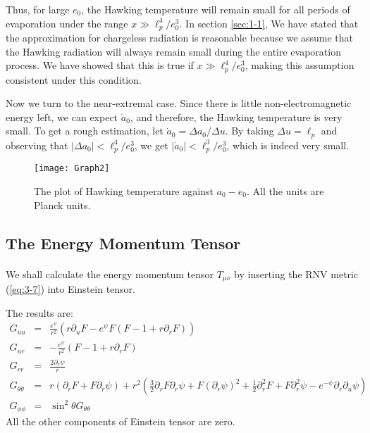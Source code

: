 \documentclass[letterpaper,12pt]{article}
\begin{document}
Thus, for large $e_{0}$, the Hawking temperature will remain small for all periods of evaporation under the range $x \gg \ell_{p}^{4}/e_{0}^{3}$. In section \ref{sec:1-1}, We have stated that the approximation for chargeless radiation is reasonable because we assume that the Hawking radiation will always remain small during the entire evaporation process. We have showed that this is true if $x \gg \ell_{p}^{4}/e_{0}^{3}$, making this assumption consistent under this condition. 

Now we turn to the near-extremal case. Since there is little non-electromagnetic energy left, we can expect $\dot{a}_{0}$, and therefore, the Hawking temperature is very small.
To get a rough estimation, let $\dot{a}_{0} = \Delta a_{0} / \Delta u$. By taking $\Delta u = \ell_{p}$ and observing that $|\Delta a_{0}| < \ell_{p}^{4}/e_{0}^{3}$, we get $|\dot{a}_{0}| < \ell_{p}^{3}/e_{0}^{3}$, which is indeed very small.  

\begin{figure}
  \centering
      \texttt{[image: Graph2]}
  \caption{The plot of Hawking temperature against $a_{0}-e_{0}$. All the units are Planck units.\label{fig1}}
\end{figure}



\subsection{The Energy Momentum Tensor}\label{sec:4-4}
\paragraph{ }
We shall calculate the energy momentum tensor $T_{\mu\nu}$ by inserting the RNV metric (\ref{eq:3-7}) into Einstein tensor.

The results are:
\begin{eqnarray}
   G_{uu} &=& \frac{e^{\psi}}{r^2}(r\partial_{u}F-e^{\psi}F(F-1+r\partial_{r}F)) \\
   G_{ur} &=& -\frac{e^{\psi}}{r^2}(F-1+r\partial_{r}F) \\
   G_{rr} &=& \frac{2\partial_{r}\psi}{r} \\
   G_{\theta\theta} &=& r(\partial_{r}F+F\partial_{r}\psi)+r^2\left(\frac{3}{2}\partial_{r}F\partial_{r}\psi+F(\partial_{r}\psi)^2
   +\frac{1}{2}\partial^{2}_{r}F+F\partial_{r}^2\psi-e^{-\psi}\partial_{r}\partial_{u}\psi\right) \\
   G_{\phi\phi} &=& \sin^2\theta G_{\theta\theta}
\end{eqnarray}
All the other components of Einstein tensor are zero.
\end{document}
